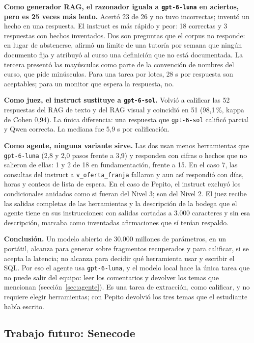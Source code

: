 \documentclass[11pt,letterpaper]{article}
\newcommand{\cod}[1]{\texttt{\small #1}}
\begin{document}
\textbf{Como generador RAG, el razonador iguala a \cod{gpt-6-luna} en aciertos, pero es 25 veces más lento.} Acertó 23 de 26 y no tuvo incorrectas; inventó un hecho en una respuesta. El instruct es más rápido y peor: 18 correctas y 3 respuestas con hechos inventados. Dos son preguntas que el corpus no responde: en lugar de abstenerse, afirmó un límite de una tutoría por semana que ningún documento fija y atribuyó al curso una definición que no está documentada. La tercera presentó las mayúsculas como parte de la convención de nombres del curso, que pide minúsculas. Para una tarea por lotes, 28 s por respuesta son aceptables; para un monitor que espera la respuesta, no.

\textbf{Como juez, el instruct sustituye a \cod{gpt-6-sol}.} Volvió a calificar las 52 respuestas del RAG de texto y del RAG visual y coincidió en 51 (98,1\,\%, kappa de Cohen 0,94). La única diferencia: una respuesta que \cod{gpt-6-sol} calificó parcial y Qwen correcta. La mediana fue 5,9 s por calificación.

\textbf{Como agente, ninguna variante sirve.} Las dos usan menos herramientas que \cod{gpt-6-luna} (2,8 y 2,0 pasos frente a 3,9) y responden con cifras o hechos que no salieron de ellas: 1 y 2 de 18 en fundamentación, frente a 15. En el caso 7, las consultas del instruct a \cod{v\_oferta\_franja} fallaron y aun así respondió con días, horas y conteos de lista de espera. En el caso de Pepito, el instruct excluyó los condicionales anidados como si fueran del Nivel 3; son del Nivel 2. El juez recibe las salidas completas de las herramientas y la descripción de la bodega que el agente tiene en sus instrucciones: con salidas cortadas a 3.000 caracteres y sin esa descripción, marcaba como inventadas afirmaciones que sí tenían respaldo.

\textbf{Conclusión.} Un modelo abierto de 30.000 millones de parámetros, en un portátil, alcanza para generar sobre fragmentos recuperados y para calificar, si se acepta la latencia; no alcanza para decidir qué herramienta usar y escribir el SQL. Por eso el agente usa \cod{gpt-6-luna}, y el modelo local hace la única tarea que no puede salir del equipo: leer los comentarios y devolver los temas que mencionan (sección~\ref{sec:agente}). Es una tarea de extracción, como calificar, y no requiere elegir herramientas; con Pepito devolvió los tres temas que el estudiante había escrito.

\subsection{Trabajo futuro: Senecode}
\label{sec:senecode}
\end{document}
